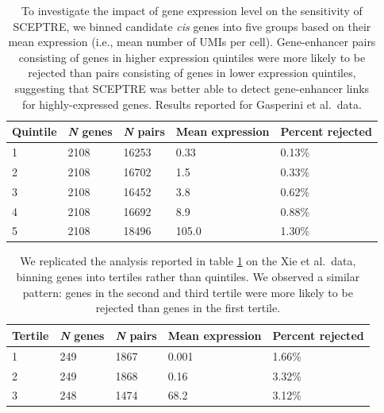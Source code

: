 \documentclass{article}
\begin{document}
\clearpage
\thispagestyle{empty}
\setcounter{table}{0}    
\renewcommand{\thetable}{S\arabic{table}}
\begin{table}
\begin{center}
	\begin{tabular}{|lllll|} 
		\hline
		\textbf{Quintile} & \textbf{\textit{N} genes}  & \textbf{\textit{N} pairs} & \textbf{Mean expression} & \textbf{Percent rejected} \\ 
		\hline
		1 & 2108 & 16253 & 0.33 & 0.13\% \\ 
		\hline
			2 & 2108 & 16702 & 1.5 & 0.33\% \\ 
		\hline
			3 & 2108 & 16452 & 3.8 & 0.62\% \\
		\hline
	 	4 & 2108 & 16692 & 8.9 & 0.88\% \\
		\hline
		5 & 2108 & 18496 & 105.0 & 1.30\% \\
		\hline
	\end{tabular}
	\caption{\label{binning_tab_gasp} To investigate the impact of gene expression level on the sensitivity of SCEPTRE, we binned candidate \textit{cis} genes into five groups based on their mean expression (i.e., mean number of UMIs per cell). Gene-enhancer pairs consisting of genes in higher expression quintiles were more likely to be rejected than pairs consisting of genes in lower expression quintiles, suggesting that SCEPTRE was better able to detect gene-enhancer links for highly-expressed genes. Results reported for Gasperini et al.\ data.}
\end{center}
\end{table}


\begin{table}
\begin{center}
	\begin{tabular}{|lllll|} 
		\hline
		\textbf{Tertile} & \textbf{\textit{N} genes}  & \textbf{\textit{N} pairs} & \textbf{Mean expression} & \textbf{Percent rejected} \\ 
		\hline
		1 & 249 & 1867 & 0.001 & 1.66\% \\ 
		\hline
			2 & 249 & 1868 & 0.16 & 3.32\% \\ 
		\hline
			3 & 248 & 1474 & 68.2 & 3.12\% \\
		\hline
	\end{tabular}
	\caption{\label{binning_tab_xie} We replicated the analysis reported in table \ref{binning_tab_gasp} on the Xie et al.\ data, binning genes into tertiles rather than quintiles. We observed a similar pattern: genes in the second and third tertile were more likely to be rejected than genes in the first tertile.}
\end{center}
\end{table}
\end{document}

